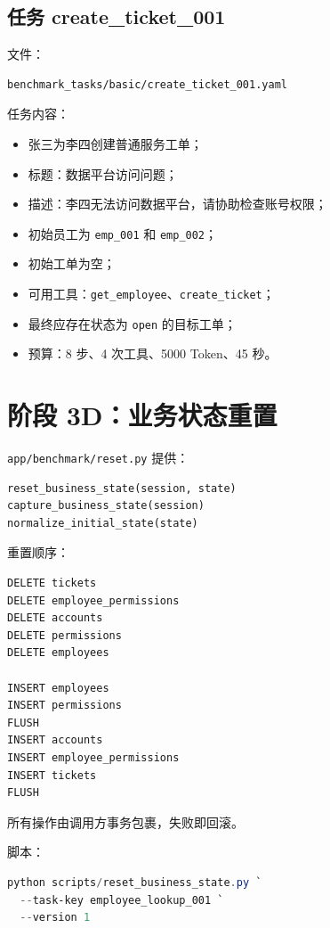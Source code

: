\documentclass[11pt,a4paper]{ctexart}
\begin{document}
\subsection{任务 create\_ticket\_001}

文件：

\begin{lstlisting}
benchmark_tasks/basic/create_ticket_001.yaml
\end{lstlisting}

任务内容：

\begin{itemize}[leftmargin=2em]
  \item 张三为李四创建普通服务工单；
  \item 标题：数据平台访问问题；
  \item 描述：李四无法访问数据平台，请协助检查账号权限；
  \item 初始员工为 \texttt{emp\_001} 和 \texttt{emp\_002}；
  \item 初始工单为空；
  \item 可用工具：\texttt{get\_employee}、\texttt{create\_ticket}；
  \item 最终应存在状态为 \texttt{open} 的目标工单；
  \item 预算：8 步、4 次工具、5000 Token、45 秒。
\end{itemize}

\section{阶段 3D：业务状态重置}

\texttt{app/benchmark/reset.py} 提供：

\begin{lstlisting}
reset_business_state(session, state)
capture_business_state(session)
normalize_initial_state(state)
\end{lstlisting}

重置顺序：

\begin{lstlisting}
DELETE tickets
DELETE employee_permissions
DELETE accounts
DELETE permissions
DELETE employees

INSERT employees
INSERT permissions
FLUSH
INSERT accounts
INSERT employee_permissions
INSERT tickets
FLUSH
\end{lstlisting}

所有操作由调用方事务包裹，失败即回滚。

脚本：

\begin{lstlisting}[language=PowerShell]
python scripts/reset_business_state.py `
  --task-key employee_lookup_001 `
  --version 1
\end{lstlisting}
\end{document}
